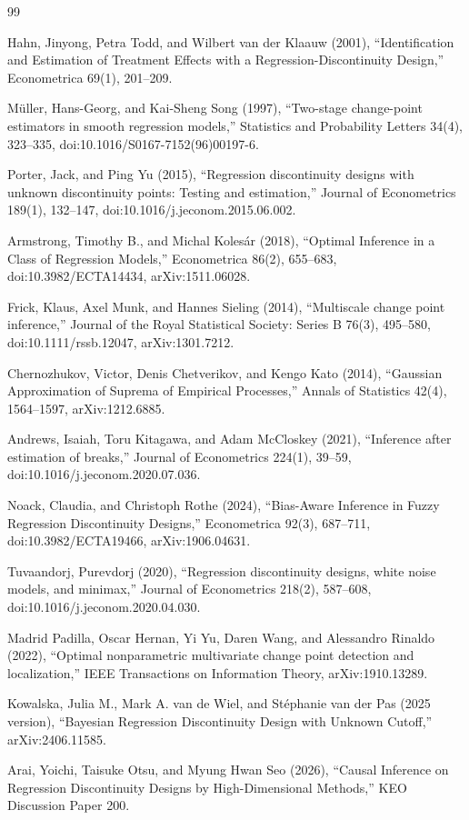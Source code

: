 \documentclass{article}
\begin{document}
\begin{thebibliography}{99}

   Hahn, Jinyong, Petra Todd, and Wilbert van der Klaauw (2001), ``Identification and Estimation of Treatment Effects with a Regression-Discontinuity Design,'' Econometrica 69(1), 201--209.

   M{\"u}ller, Hans-Georg, and Kai-Sheng Song (1997), ``Two-stage change-point estimators in smooth regression models,'' Statistics and Probability Letters 34(4), 323--335, doi:10.1016/S0167-7152(96)00197-6.

   Porter, Jack, and Ping Yu (2015), ``Regression discontinuity designs with unknown discontinuity points: Testing and estimation,'' Journal of Econometrics 189(1), 132--147, doi:10.1016/j.jeconom.2015.06.002.

   Armstrong, Timothy B., and Michal Koles{\'a}r (2018), ``Optimal Inference in a Class of Regression Models,'' Econometrica 86(2), 655--683, doi:10.3982/ECTA14434, arXiv:1511.06028.

   Frick, Klaus, Axel Munk, and Hannes Sieling (2014), ``Multiscale change point inference,'' Journal of the Royal Statistical Society: Series B 76(3), 495--580, doi:10.1111/rssb.12047, arXiv:1301.7212.

   Chernozhukov, Victor, Denis Chetverikov, and Kengo Kato (2014), ``Gaussian Approximation of Suprema of Empirical Processes,'' Annals of Statistics 42(4), 1564--1597, arXiv:1212.6885.

   Andrews, Isaiah, Toru Kitagawa, and Adam McCloskey (2021), ``Inference after estimation of breaks,'' Journal of Econometrics 224(1), 39--59, doi:10.1016/j.jeconom.2020.07.036.

   Noack, Claudia, and Christoph Rothe (2024), ``Bias-Aware Inference in Fuzzy Regression Discontinuity Designs,'' Econometrica 92(3), 687--711, doi:10.3982/ECTA19466, arXiv:1906.04631.

   Tuvaandorj, Purevdorj (2020), ``Regression discontinuity designs, white noise models, and minimax,'' Journal of Econometrics 218(2), 587--608, doi:10.1016/j.jeconom.2020.04.030.

   Madrid Padilla, Oscar Hernan, Yi Yu, Daren Wang, and Alessandro Rinaldo (2022), ``Optimal nonparametric multivariate change point detection and localization,'' IEEE Transactions on Information Theory, arXiv:1910.13289.

   Kowalska, Julia M., Mark A. van de Wiel, and St{\'e}phanie van der Pas (2025 version), ``Bayesian Regression Discontinuity Design with Unknown Cutoff,'' arXiv:2406.11585.

   Arai, Yoichi, Taisuke Otsu, and Myung Hwan Seo (2026), ``Causal Inference on Regression Discontinuity Designs by High-Dimensional Methods,'' KEO Discussion Paper 200.

\end{thebibliography}
\end{document}
